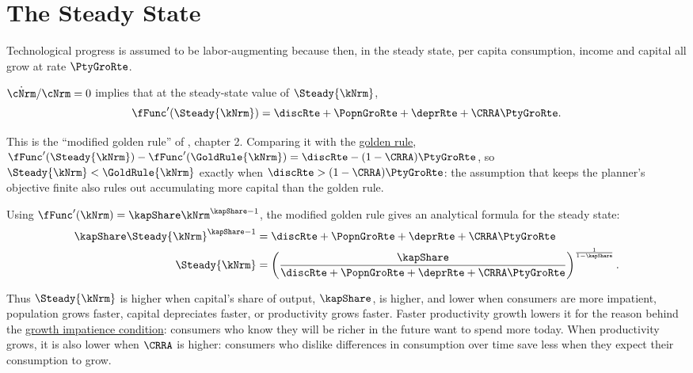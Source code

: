 \documentclass{econark}
\begin{document}
\section{The Steady State}\label{sec:RCK-SteadyState}

Technological progress is assumed to be labor-augmenting because then,
in the steady state, per capita consumption, income
and capital all grow at rate $\PtyGroRte$.

$\dot{\cNrm}/\cNrm = 0$ implies that at the steady-state value of $\Steady{\kNrm}$,
\begin{equation}
  \fFunc^{\prime}(\Steady{\kNrm}) = \discRte +\PopnGroRte+\deprRte+\CRRA \PtyGroRte . \label{eq:RCK-modGoldenRule}
\end{equation}

This is the ``modified golden rule'' of \citet{blanchard&fischer:text}, chapter 2. Comparing it with the \hyperref[eq:RCK-goldenRule]{golden rule}, $\fFunc^{\prime}(\Steady{\kNrm}) - \fFunc^{\prime}(\GoldRule{\kNrm}) = \discRte - (1-\CRRA)\PtyGroRte$, so $\Steady{\kNrm} < \GoldRule{\kNrm}$ exactly when $\discRte > (1-\CRRA)\PtyGroRte$: the assumption that keeps the planner's objective finite also rules out accumulating more capital than the golden rule.

Using $\fFunc^{\prime}(\kNrm) = \kapShare \kNrm^{\kapShare-1}$, the modified golden rule gives an analytical formula for the steady state:
\begin{equation}\begin{gathered}\begin{aligned}
  \kapShare \Steady{\kNrm}^{\kapShare-1} & =  \discRte +\PopnGroRte+\deprRte+\CRRA \PtyGroRte  \\
  \Steady{\kNrm} & =  \left(\frac{\kapShare}{\discRte +\PopnGroRte+\deprRte+\CRRA \PtyGroRte}\right)^{\frac{1}{1-\kapShare}} . \label{eq:RCK-kSteadyCobbDouglas}
\end{aligned}\end{gathered}\end{equation}

Thus $\Steady{\kNrm}$ is higher when capital's share of output, $\kapShare$, is higher, and lower when consumers are more impatient, population grows faster, capital depreciates faster, or productivity grows faster. Faster productivity growth lowers it for the reason behind the \href{https://intertemporal-choice.github.io/content/consumption/perfforesightcrra/\#eq-patwgrocond}{growth impatience condition}: consumers who know they will be richer in the future want to spend more today. When productivity grows, it is also lower when $\CRRA$ is higher: consumers who dislike differences in consumption over time save less when they expect their consumption to grow.
\end{document}
